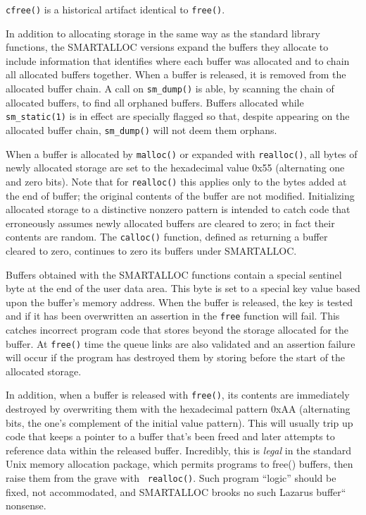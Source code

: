 {\tt cfree()} is a historical artifact identical to {\tt free()}.

In addition to allocating storage in the same way as the standard library
functions, the SMARTALLOC versions expand the buffers they allocate to include
information that identifies where each buffer was allocated and to chain all
allocated buffers together. When a buffer is released, it is removed from the
allocated buffer chain. A call on {\tt sm\_dump()} is able, by scanning the
chain of allocated buffers, to find all orphaned buffers. Buffers allocated
while {\tt sm\_static(1)} is in effect are specially flagged so that, despite
appearing on the allocated buffer chain, {\tt sm\_dump()} will not deem them
orphans.

When a buffer is allocated by {\tt malloc()} or expanded with {\tt realloc()},
all bytes of newly allocated storage are set to the hexadecimal value 0x55
(alternating one and zero bits). Note that for {\tt realloc()} this applies
only to the bytes added at the end of buffer; the original contents of the
buffer are not modified. Initializing allocated storage to a distinctive
nonzero pattern is intended to catch code that erroneously assumes newly
allocated buffers are cleared to zero; in fact their contents are random. The
{\tt calloc()} function, defined as returning a buffer cleared to zero,
continues to zero its buffers under SMARTALLOC.

Buffers obtained with the SMARTALLOC functions contain a special sentinel byte
at the end of the user data area. This byte is set to a special key value
based upon the buffer's memory address. When the buffer is released, the key
is tested and if it has been overwritten an assertion in the {\tt free}
function will fail. This catches incorrect program code that stores beyond the
storage allocated for the buffer. At {\tt free()} time the queue links are
also validated and an assertion failure will occur if the program has
destroyed them by storing before the start of the allocated storage.

In addition, when a buffer is released with {\tt free()}, its contents are
immediately destroyed by overwriting them with the hexadecimal pattern 0xAA
(alternating bits, the one's complement of the initial value pattern). This
will usually trip up code that keeps a pointer to a buffer that's been freed
and later attempts to reference data within the released buffer. Incredibly,
this is {\it legal} in the standard Unix memory allocation package, which
permits programs to free() buffers, then raise them from the grave with {\tt
realloc()}. Such program ``logic'' should be fixed, not accommodated, and
SMARTALLOC brooks no such Lazarus buffer`` nonsense.

